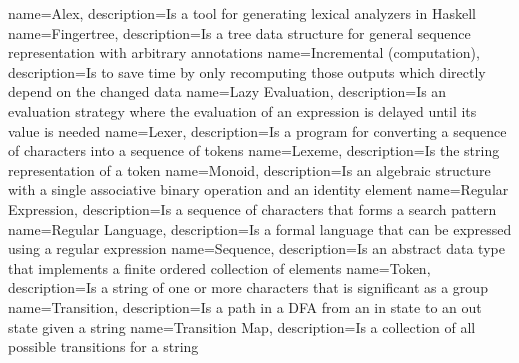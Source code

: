 
{
        name=Alex,
            description={Is a tool for generating lexical analyzers in Haskell}
}
{
        name=Fingertree,
            description={Is a tree data structure for general
            sequence representation with arbitrary annotations}
}
{
        name=Incremental (computation),
            description={Is to save time by only recomputing those outputs which
            directly depend on the changed data}
}
{
        name=Lazy Evaluation,
            description={Is an evaluation strategy where the evaluation of an
            expression is delayed until its value is needed}
}
{
        name=Lexer,
            description={Is a program for converting a sequence of characters
            into a sequence of tokens}
}
{
        name=Lexeme,
            description={Is the string representation of a token}
}
{
        name=Monoid,
            description={Is an algebraic structure with a single associative
            binary operation and an identity element}
}
{
        name=Regular Expression,
            description={Is a sequence of characters that forms a search
            pattern}
}
{
        name=Regular Language,
            description={Is a formal language that can be expressed using a
            regular expression}
}
{
        name=Sequence,
            description={Is an abstract data type that implements a finite
            ordered collection of elements}
}
{
        name=Token,
            description={Is a string of one or more characters that is
            significant as a group}
}
{
        name=Transition,
            description={Is a path in a DFA from an in state to an out state
            given a string}
}
{
        name=Transition Map,
            description={Is a collection of all possible transitions for a
            string}
}
